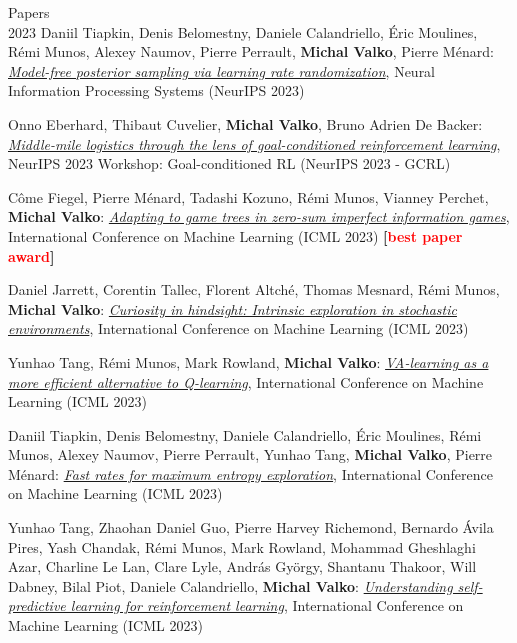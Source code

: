 \documentclass{resume}
\begin{document}
\begin{category}{Papers\\2023}
\citembullet
Daniil Tiapkin, Denis Belomestny, Daniele Calandriello, \' Eric Moulines, R\' emi Munos, Alexey Naumov,  Pierre Perrault, {\bf Michal Valko}, Pierre M\' enard: 
\href{https://arxiv.org/pdf/2310.18186.pdf} {
\emph{Model-free posterior sampling via learning rate randomization}},
Neural Information Processing Systems
({\sf NeurIPS 2023}) 



\citembullet
Onno Eberhard, Thibaut Cuvelier, {\bf Michal Valko}, Bruno Adrien De Backer:
\href{https://openreview.net/pdf?id=l8iK6YqgkR}{\emph{Middle-mile logistics through the lens of goal-conditioned reinforcement learning}},
NeurIPS 2023 Workshop: Goal-conditioned RL
({\sf NeurIPS 2023 - GCRL}) 


\citembullet
C\^ome Fiegel, Pierre M\' enard, Tadashi Kozuno, R\' emi Munos, Vianney Perchet,  {\bf Michal Valko}:
\href{https://arxiv.org/pdf/2212.12567}{\emph{Adapting to game trees in zero-sum imperfect information games}},
International Conference on Machine Learning
({\sf ICML 2023}) 
{\bf [\textcolor{red}{best paper award}]}


\citembullet
Daniel Jarrett, Corentin Tallec, Florent Altch\'e, Thomas Mesnard, R\'emi Munos, {\bf Michal Valko}:
\href{https://arxiv.org/pdf/2206.08332.pdf}
{\emph{Curiosity in hindsight: Intrinsic exploration in stochastic environments}},
International Conference on Machine Learning
({\sf ICML 2023}) 

\citembullet
Yunhao Tang, R\' emi Munos, Mark Rowland,  {\bf Michal Valko}: 
\href{https://arxiv.org/pdf/2305.18161.pdf}
{\emph{VA-learning as a more efficient alternative to Q-learning}}, 
International Conference on Machine Learning
({\sf ICML 2023}) 

\citembullet
Daniil Tiapkin, Denis Belomestny, Daniele Calandriello, \' Eric Moulines, R\' emi Munos, Alexey Naumov,  Pierre Perrault, Yunhao Tang, {\bf Michal Valko}, Pierre M\' enard: 
\href{https://arxiv.org/abs/2303.08059.pdf} 
{\emph{Fast rates for maximum entropy exploration}},
International Conference on Machine Learning
({\sf ICML 2023}) 



\citembullet
Yunhao Tang, Zhaohan Daniel Guo, Pierre Harvey Richemond, Bernardo \'Avila Pires, Yash Chandak, R\'emi Munos, Mark Rowland, Mohammad Gheshlaghi Azar, Charline Le Lan, Clare Lyle, Andr\'as Gy\"orgy, Shantanu Thakoor, Will Dabney, Bilal Piot, Daniele Calandriello, {\bf Michal Valko}:
\href{https://arxiv.org/pdf/2205.14211.pdf}
{\emph{Understanding self-predictive learning for reinforcement learning}},
International Conference on Machine Learning
({\sf ICML 2023}) 


\end{category}
\end{document}
